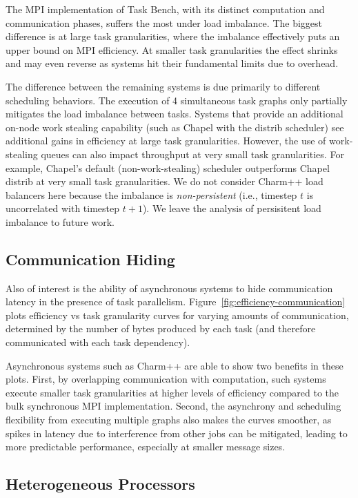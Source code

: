 The MPI implementation of Task Bench, with its distinct computation and communication phases,
suffers the most under load imbalance. The biggest
difference is at large task granularities, where the imbalance
effectively puts an upper bound on MPI efficiency. At smaller task
granularities the effect shrinks and may even reverse as systems hit
their fundamental limits due to overhead.

The difference between the remaining systems is due primarily to
different scheduling behaviors. The execution of 4
simultaneous task graphs only partially mitigates the
load imbalance between tasks. Systems that provide an
additional on-node work stealing capability (such as Chapel with the distrib scheduler) see additional gains in
efficiency at large task granularities. However, the use of
work-stealing queues can also impact throughput at very small task
granularities. For example, Chapel's default (non-work-stealing) scheduler outperforms Chapel distrib at very small task granularities. We do not consider Charm++ load balancers here because the imbalance is \emph{non-persistent} (i.e., timestep $t$ is uncorrelated with timestep $t+1$). We leave the analysis of persisitent load imbalance to future work.

\subsection{Communication Hiding}



Also of interest is the ability of asynchronous systems to
hide communication latency in the presence of task
parallelism. Figure~\ref{fig:efficiency-communication} plots efficiency vs task
granularity curves for varying amounts of
communication, determined by the number
of bytes produced by each task (and therefore communicated with each
task dependency).

Asynchronous systems such as Charm++ are able to show two benefits in
these plots. First, by overlapping communication with computation,
such systems execute smaller task granularities at higher
levels of efficiency compared to the bulk synchronous MPI
implementation. Second, the asynchrony and scheduling flexibility from
executing multiple graphs also makes the curves smoother,
as spikes in latency due to interference from other jobs can be
mitigated, leading to more predictable performance, especially at
smaller message sizes.

\subsection{Heterogeneous Processors}



